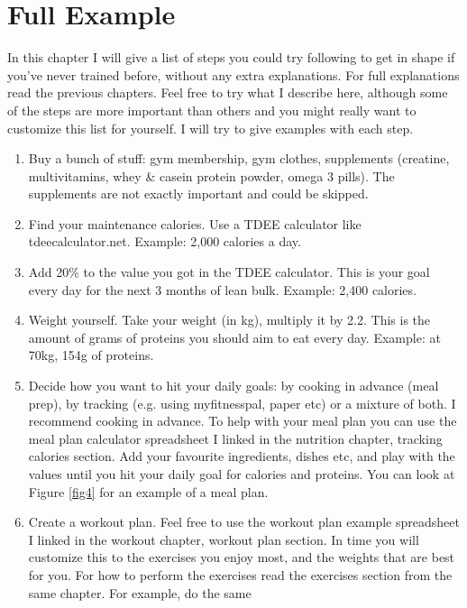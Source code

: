 \documentclass[openany, 12pt]{book}
\begin{document}
  \chapter{Full Example}

  
  In this chapter I will give a list of steps you could try following to get in shape if you've never trained before, without any extra explanations.
  For full explanations read the previous chapters. Feel free to try what I describe here,
  although some of the steps are more important than others and you might really want to customize this list for yourself. I will try to give examples with each step.
        
        \begin{enumerate}
                \item Buy a bunch of stuff: gym membership, gym clothes, supplements (creatine, multivitamins, whey \& casein protein powder, omega 3 pills). The supplements are not exactly important
                  and could be skipped.
                \item Find your maintenance calories. Use a TDEE calculator like tdeecalculator.net. Example: 2,000 calories a day.
                \item Add 20\% to the value you got in the TDEE calculator. This is your goal every day for the next 3 months of lean bulk. Example: 2,400 calories.
                \item Weight yourself. Take your weight (in kg), multiply it by 2.2. This is the amount of grams of proteins you should aim to eat every day. Example: at 70kg, 154g of proteins.
                \item Decide how you want to hit your daily goals: by cooking in advance (meal prep), by tracking (e.g. using myfitnesspal, paper etc) or a mixture of both. I recommend cooking in
                  advance. To help with your meal plan you can use the meal plan calculator spreadsheet I linked in the nutrition chapter, tracking calories section. Add your favourite ingredients,
                  dishes etc, and play with the values until you hit your daily goal for calories and proteins. You can look at Figure \ref{fig4} for an example of a meal plan.
                \item Create a workout plan. Feel free to use the workout plan example spreadsheet I linked in the workout chapter, workout plan section. In time you will customize this to
                  the exercises you enjoy most, and the weights that are best for you. For how to perform the exercises read the exercises section from the same chapter. For example, do the same

\end{enumerate}
\end{document}
